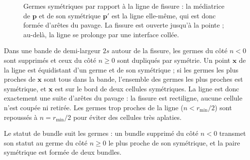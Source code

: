 \documentclass[11pt,a4paper]{article}
\newcommand{\code}[1]{\texttt{#1}}
\begin{document}
\begin{figure}[H]
  \centering
  \caption{Germes symétriques par rapport à la ligne de fissure : la médiatrice de $\mathbf p$ et de son
    symétrique $\mathbf p'$ est la ligne elle-même, qui est donc formée d'arêtes du pavage. La fissure est ouverte
    jusqu'à la pointe ; au-delà, la ligne se prolonge par une interface collée.}
  \label{fig:mirror}
\end{figure}

Dans une bande de demi-largeur $2s$ autour de la fissure, les germes du côté $n<0$ sont supprimés et ceux du côté
$n\ge0$ sont dupliqués par symétrie. Un point $\mathbf x$ de la ligne est équidistant d'un germe et de son
symétrique ; si les germes les plus proches de $\mathbf x$ sont tous dans la bande, l'ensemble des germes les plus
proches est symétrique, et $\mathbf x$ est sur le bord de deux cellules symétriques. La ligne est donc exactement
une suite d'arêtes du pavage : la fissure est rectiligne, aucune cellule n'est coupée ni retirée. Les germes trop
proches de la ligne ($n<r_{\min}/2$) sont repoussés à $n=r_{\min}/2$ pour éviter des cellules très aplaties.

Le statut de bundle suit les germes : un bundle supprimé du côté $n<0$ transmet son statut au germe du côté $n\ge0$
le plus proche de son symétrique, et la paire symétrique est formée de deux bundles.
\end{document}
